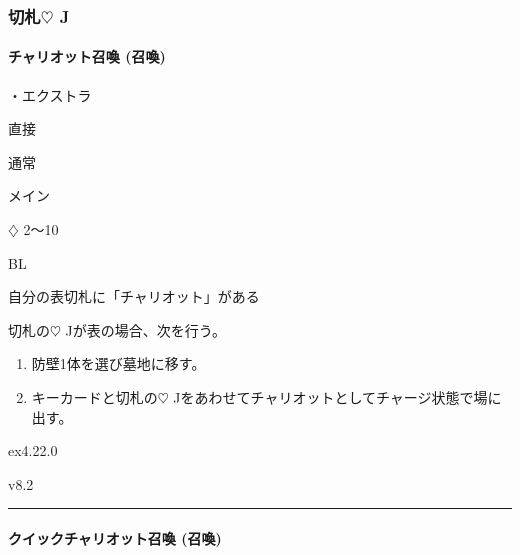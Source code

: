 \documentclass[letterpaper,10pt,dvipdfmx]{sphinxmanual}
\begin{document}
\subsubsection{切札{\normalsize $\heartsuit$} J}
\label{\detokenize{auto/frameActionlist:id44}}

\paragraph{チャリオット召喚 (召喚)}
\label{\detokenize{auto/frameActionlist:act-summonchariot}}\label{\detokenize{auto/frameActionlist:id45}}
\sphinxAtStartPar
{}

\sphinxAtStartPar
・エクストラ

\sphinxAtStartPar
{} 直接

\sphinxAtStartPar
{} 通常

\sphinxAtStartPar
{} メイン

\sphinxAtStartPar
{} {\normalsize $\diamondsuit$} 2〜10

\sphinxAtStartPar
{} BL

\sphinxAtStartPar
{}

\sphinxAtStartPar
自分の表切札に「チャリオット」がある

\sphinxAtStartPar
{}

\sphinxAtStartPar
切札の{\normalsize $\heartsuit$} Jが表の場合、次を行う。
\begin{enumerate}
%
\item {} 
\sphinxAtStartPar
防壁1体を選び墓地に移す。

\item {} 
\sphinxAtStartPar
キーカードと切札の{\normalsize $\heartsuit$} Jをあわせてチャリオットとしてチャージ状態で場に出す。

\end{enumerate}

\sphinxAtStartPar
{}  ex4.22.0

\sphinxAtStartPar
{}  v8.2


\bigskip\hrule\bigskip



\paragraph{クイックチャリオット召喚 (召喚)}
\label{\detokenize{auto/frameActionlist:act-quicksummonchariot}}\label{\detokenize{auto/frameActionlist:id46}}
\sphinxAtStartPar
{}
\end{document}

